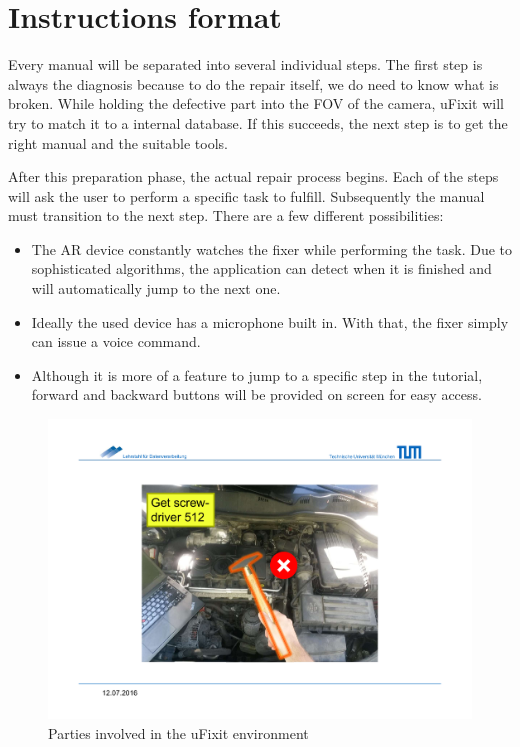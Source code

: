	\section{Instructions format}
	\label{sec:instr-format}
	
		Every manual will be separated into several individual steps. The first step is always the diagnosis because to do the repair itself, we do need to know what is broken. While holding the defective part into the FOV of the camera, uFixit will try to match it to a internal database. If this succeeds, the next step is to get the right manual and the suitable tools.
		
		
		After this preparation phase, the actual repair process begins. Each of the steps will ask the user to perform a specific task to fulfill. Subsequently the manual must transition to the next step. There are a few different possibilities:
		
		\begin{itemize}
			\itemsep0em
			\item The AR device constantly watches the fixer while performing the task. Due to sophisticated algorithms, the application can detect when it is finished and will automatically jump to the next one.
			\item Ideally the used device has a microphone built in. With that, the fixer simply can issue a voice command.
			\item Although it is more of a feature to jump to a specific step in the tutorial, forward and backward buttons will be provided on screen for easy access.
		\end{itemize}
		
		\begin{figure}[H]
			\includegraphics[width=\textwidth, trim=4cm 3cm 4cm 4cm, clip]{../images/instr-hammer.pdf}
			\centering
			\caption{Parties involved in the uFixit environment}
			\label{fig:instr-hammer}
		\end{figure}
		
